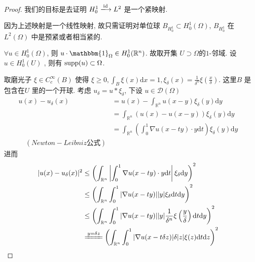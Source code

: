 \documentclass[11pt]{ctexart}[UTF8]
\begin{document}
\begin{proof}
    我们的目标是去证明 $H_{0}^{1} \xlongrightarrow{\operatorname{id}}L^2$ 是一个紧映射.\par
    因为上述映射是一个线性映射, 故只需证明对单位球 $B_{H_{0}^{1}} \subset H_{0}^{1}(\Omega)$, $B_{H_{0}^{1}}$ 在 $L^2(\Omega)$ 中是预紧或者相当紧的.\par
    $\forall u \in H_{0}^{1}(\Omega)$, 则 $u\cdot \mathbbm{1}_{\Omega} \in H_{0}^{1}(\mathbb{R}^n)$. 故取开集 $U \supset \Omega\text{的1-邻域}$.
    设 $u \in H_{0}^{1}(U)$ , 则有 $\operatorname{supp}(u) \subset \Omega$.\par
    取磨光子 $\xi \in C_{c}^{\infty}(B)$ 使得 $\xi \geq 0, \int_{B} \xi(x) \mathrm{d}x = 1, \xi_{\delta}(x) = \frac{1}{\delta^n}\xi\left(\frac{x}{\delta}\right)$. 这里$B$ 是包含在$U$ 里的一个开球.
    考虑 $u_{\delta} = u \ast \xi_{\delta}$, 下设 $u \in \mathscr{D}(\Omega)$
    \begin{equation*}
        \begin{aligned}
            u(x) - u_{\delta}(x) &= u(x) - \int_{\mathbb{R}^n} u(x-y)\xi_{\delta}(y) \mathrm{d}y\\
                                 &= \int_{\mathbb{R}^n} (u(x) - u(x-y))\xi_{\delta}(y) \mathrm{d}y\\
                                 &= \int_{\mathbb{R}^n} \left( \int_{0}^{1} \nabla u(x-ty) \cdot y \mathrm{d}t \right) \xi_{\delta}(y) \mathrm{d}y\\ \quad(Newton-Leibniz公式)
        \end{aligned}
    \end{equation*}
    进而
    \begin{equation*}
        \begin{aligned}
            |u(x) - u_{\delta}(x)|^{2}  &\leq \left( \int_{\mathbb{R}^n} \left| \int_{0}^{1} \nabla u(x-ty) \cdot y \mathrm{d}t \right|\xi_{\delta} \mathrm{d}y \right)^2\\
                                        &\leq \left( \int_{\mathbb{R}^n} \int_{0}^{1} |\nabla u(x-ty)| |y|\xi_{\delta} \mathrm{d}t \mathrm{d}y \right)^2\\
                                        &\leq \left( \int_{\mathbb{R}^n} \int_{0}^{1} |\nabla u(x-ty)||y|\frac{1}{\delta^{n}}\xi\left(\frac{y}{\delta}\right) \mathrm{d}t \mathrm{d}y \right)^2\\
                                        &\xlongequal{y=\delta z} \left( \int_{\mathbb{R}^n} \int_{0}^{1} |\nabla u(x-t\delta z)| \delta|z| \xi(z) \mathrm{d}t \mathrm{d}z \right)^2\\

\end{aligned}
\end{equation*}
\end{proof}
\end{document}
